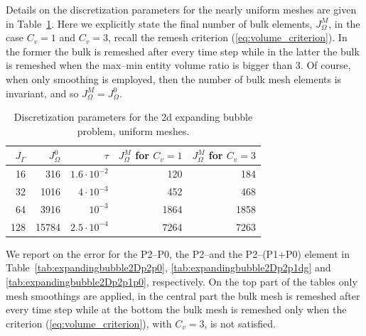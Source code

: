 Details on the discretization parameters for the nearly uniform meshes are
given in Table~\ref{tab:expandingbubble2Delements}. Here we explicitly
state the final number of bulk elements, $J_\Omega^M$, in the case $C_v = 1$
and $C_v = 3$, recall the remesh criterion (\ref{eq:volume_criterion}). In the
former the bulk is remeshed after every time step while in the latter the bulk
is remeshed when the max--min entity volume ratio is bigger than 3. Of course,
when only smoothing is employed, then the number of bulk mesh elements is
invariant, and so $J_\Omega^M = J_\Omega^0$.
\begin{table}
\center
\begin{tabular}{rrrrr}
\hline
$J_\Gamma$ & $J_\Omega^0$ & $\tau$ & $J_\Omega^M$ for $C_v=1$ &
$J_\Omega^M$ for $C_v=3$ \\
\hline
 16 &   316 & $1.6\cdot10^{-2}$ &  120 &  184 \\
 32 &  1016 &   $4\cdot10^{-3}$ &  452 &  468 \\
 64 &  3916 &         $10^{-3}$ & 1864 & 1858 \\
128 & 15784 & $2.5\cdot10^{-4}$ & 7264 & 7263 \\
\hline
\end{tabular}
\caption[Stokes expanding bubble uniform meshes parameters]
{Discretization parameters for the 2d expanding bubble problem, uniform meshes.}
\label{tab:expandingbubble2Delements}
\end{table}
We report on the error for the P2--P0, the P2--\pdg and the P2--(P1+P0)
element in Table~\ref{tab:expandingbubble2Dp2p0},
\ref{tab:expandingbubble2Dp2p1dg} and \ref{tab:expandingbubble2Dp2p1p0},
respectively. On the top part of the tables only mesh smoothings are applied,
in the central part the bulk mesh is remeshed after every time step while at
the bottom the bulk mesh is remeshed only when the criterion
(\ref{eq:volume_criterion}), with $C_v=3$, is not satisfied.

